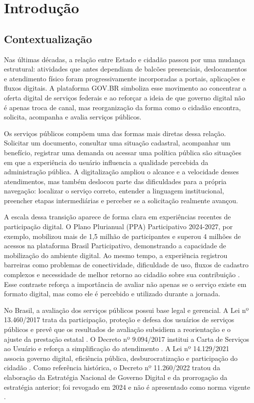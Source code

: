 \chapter{Introdução}
\label{cap:1}

\section{Contextualização}
\label{sec:1.1}

Nas últimas décadas, a relação entre Estado e cidadão passou por uma mudança estrutural: atividades que antes dependiam de balcões presenciais, deslocamentos e atendimento físico foram progressivamente incorporadas a portais, aplicações e fluxos digitais. A plataforma GOV.BR simboliza esse movimento ao concentrar a oferta digital de serviços federais e ao reforçar a ideia de que governo digital não é apenas troca de canal, mas reorganização da forma como o cidadão encontra, solicita, acompanha e avalia serviços públicos.

Os serviços públicos compõem uma das formas mais diretas dessa relação. Solicitar um documento, consultar uma situação cadastral, acompanhar um benefício, registrar uma demanda ou acessar uma política pública são situações em que a experiência do usuário influencia a qualidade percebida da administração pública. A digitalização ampliou o alcance e a velocidade desses atendimentos, mas também deslocou parte das dificuldades para a própria navegação: localizar o serviço correto, entender a linguagem institucional, preencher etapas intermediárias e perceber se a solicitação realmente avançou.

A escala dessa transição aparece de forma clara em experiências recentes de participação digital. O Plano Plurianual (PPA) Participativo 2024-2027, por exemplo, mobilizou mais de 1,5 milhão de participantes e superou 4 milhões de acessos na plataforma Brasil Participativo, demonstrando a capacidade de mobilização do ambiente digital. Ao mesmo tempo, a experiência registrou barreiras como problemas de conectividade, dificuldade de uso, fluxos de cadastro complexos e necessidade de melhor retorno ao cidadão sobre sua contribuição \cite{mgi2024}. Esse contraste reforça a importância de avaliar não apenas se o serviço existe em formato digital, mas como ele é percebido e utilizado durante a jornada.

No Brasil, a avaliação dos serviços públicos possui base legal e gerencial. A Lei nº 13.460/2017 trata da participação, proteção e defesa dos usuários de serviços públicos e prevê que os resultados de avaliação subsidiem a reorientação e o ajuste da prestação estatal \cite{brasil2017lei}. O Decreto nº 9.094/2017 institui a Carta de Serviços ao Usuário e reforça a simplificação do atendimento \cite{brasil2017decreto}. A Lei nº 14.129/2021 associa governo digital, eficiência pública, desburocratização e participação do cidadão \cite{brasil2021}. Como referência histórica, o Decreto nº 11.260/2022 tratou da elaboração da Estratégia Nacional de Governo Digital e da prorrogação da estratégia anterior; foi revogado em 2024 e não é apresentado como norma vigente \cite{brasil2022}.

